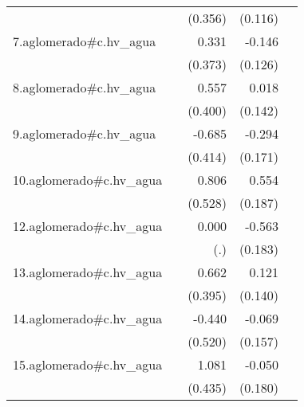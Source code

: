 {\begin{longtable}{l*{4}{D{.}{.}{-1}}}
            &                     &     (0.356)         &     (0.116)         &                     \\
\addlinespace
7.aglomerado#c.hv\_agua&                     &       0.331         &      -0.146         &                     \\
            &                     &     (0.373)         &     (0.126)         &                     \\
\addlinespace
8.aglomerado#c.hv\_agua&                     &       0.557         &       0.018         &                     \\
            &                     &     (0.400)         &     (0.142)         &                     \\
\addlinespace
9.aglomerado#c.hv\_agua&                     &      -0.685         &      -0.294         &                     \\
            &                     &     (0.414)         &     (0.171)         &                     \\
\addlinespace
10.aglomerado#c.hv\_agua&                     &       0.806         &       0.554\sym{**} &                     \\
            &                     &     (0.528)         &     (0.187)         &                     \\
\addlinespace
12.aglomerado#c.hv\_agua&                     &       0.000         &      -0.563\sym{**} &                     \\
            &                     &         (.)         &     (0.183)         &                     \\
\addlinespace
13.aglomerado#c.hv\_agua&                     &       0.662         &       0.121         &                     \\
            &                     &     (0.395)         &     (0.140)         &                     \\
\addlinespace
14.aglomerado#c.hv\_agua&                     &      -0.440         &      -0.069         &                     \\
            &                     &     (0.520)         &     (0.157)         &                     \\
\addlinespace
15.aglomerado#c.hv\_agua&                     &       1.081\sym{*}  &      -0.050         &                     \\
            &                     &     (0.435)         &     (0.180)         &                     \\

\end{longtable}}
